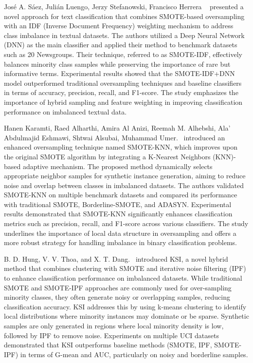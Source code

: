 \documentclass[conference]{IEEEtran}
\begin{document}
José A. Sáez, Julián Luengo, Jerzy Stefanowski, Francisco Herrera ~\cite{b2} presented a novel approach for text classification that combines SMOTE-based oversampling with an IDF (Inverse Document Frequency) weighting mechanism to address class imbalance in textual datasets. The authors utilized a Deep Neural Network (DNN) as the main classifier and applied their method to benchmark datasets such as 20 Newsgroups. Their technique, referred to as SMOTE-IDF, effectively balances minority class samples while preserving the importance of rare but informative terms. Experimental results showed that the SMOTE-IDF+DNN model outperformed traditional oversampling techniques and baseline classifiers in terms of accuracy, precision, recall, and F1-score. The study emphasizes the importance of hybrid sampling and feature weighting in improving classification performance on imbalanced textual data.

Hanen Karamti, Raed Alharthi, Amira Al Anizi, Reemah M. Alhebshi, Ala’ Abdulmajid Eshmawi, Shtwai Alsubai, Muhammad Umer.~\cite{b3} introduced an enhanced oversampling technique named SMOTE-KNN, which improves upon the original SMOTE algorithm by integrating a K-Nearest Neighbors (KNN)-based adaptive mechanism. The proposed method dynamically selects appropriate neighbor samples for synthetic instance generation, aiming to reduce noise and overlap between classes in imbalanced datasets. The authors validated SMOTE-KNN on multiple benchmark datasets and compared its performance with traditional SMOTE, Borderline-SMOTE, and ADASYN. Experimental results demonstrated that SMOTE-KNN significantly enhances classification metrics such as precision, recall, and F1-score across various classifiers. The study underlines the importance of local data structure in oversampling and offers a more robust strategy for handling imbalance in binary classification problems.

B. D. Hung, V. V. Thoa, and X. T. Dang.~\cite{b4} introduced KSI, a novel hybrid method that combines clustering with SMOTE and iterative noise filtering (IPF) to enhance classification performance on imbalanced datasets. While traditional SMOTE and SMOTE-IPF approaches are commonly used for over-sampling minority classes, they often generate noisy or overlapping samples, reducing classification accuracy. KSI addresses this by using k-means clustering to identify local distributions where minority instances may dominate or be sparse. Synthetic samples are only generated in regions where local minority density is low, followed by IPF to remove noise. Experiments on multiple UCI datasets demonstrated that KSI outperforms baseline methods (SMOTE, IPF, SMOTE-IPF) in terms of G-mean and AUC, particularly on noisy and borderline samples.
\end{document}
